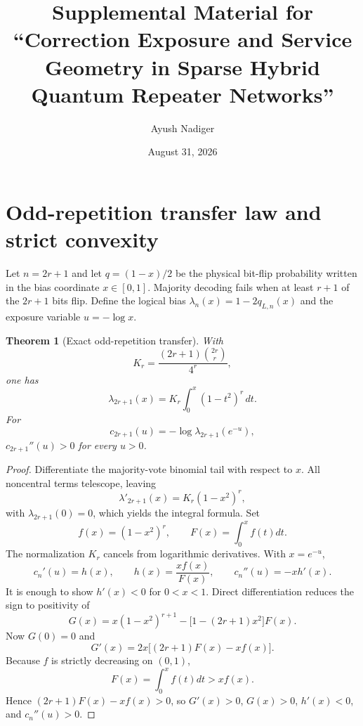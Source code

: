 \documentclass[aps,prx,preprint,superscriptaddress,nofootinbib,longbibliography]{revtex4-2}
\newtheorem{theorem}{Theorem}\newtheorem{proposition}[theorem]{Proposition}\newtheorem{lemma}[theorem]{Lemma}\newtheorem{corollary}[theorem]{Corollary}\newtheorem{definition}[theorem]{Definition}
\begin{document}
\title{Supplemental Material for ``Correction Exposure and Service Geometry in Sparse Hybrid Quantum Repeater Networks''}
\author{Ayush Nadiger}
\date{August 31, 2026}\maketitle

\section{Odd-repetition transfer law and strict convexity}
Let $n=2r+1$ and let $q=(1-x)/2$ be the physical bit-flip probability written in the bias coordinate $x\in[0,1]$. Majority decoding fails when at least $r+1$ of the $2r+1$ bits flip. Define the logical bias $\lambda_n(x)=1-2q_{L,n}(x)$ and the exposure variable $u=-\log x$.

\begin{theorem}[Exact odd-repetition transfer]
With
\begin{equation}
K_r=\frac{(2r+1)\binom{2r}{r}}{4^r},
\end{equation}
one has
\begin{equation}
\lambda_{2r+1}(x)=K_r\int_0^x(1-t^2)^r\,dt.
\end{equation}
For
\begin{equation}
c_{2r+1}(u)=-\log\lambda_{2r+1}(e^{-u}),
\end{equation}
$c_{2r+1}''(u)>0$ for every $u>0$.
\end{theorem}
\begin{proof}
Differentiate the majority-vote binomial tail with respect to $x$. All noncentral terms telescope, leaving
\begin{equation}
\lambda'_{2r+1}(x)=K_r(1-x^2)^r,
\end{equation}
with $\lambda_{2r+1}(0)=0$, which yields the integral formula. Set
\begin{equation}
f(x)=(1-x^2)^r,\qquad F(x)=\int_0^x f(t)dt.
\end{equation}
The normalization $K_r$ cancels from logarithmic derivatives. With $x=e^{-u}$,
\begin{equation}
c_n'(u)=h(x),\qquad h(x)=\frac{x f(x)}{F(x)},\qquad c_n''(u)=-x h'(x).
\end{equation}
It is enough to show $h'(x)<0$ for $0<x<1$. Direct differentiation reduces the sign to positivity of
\begin{equation}
G(x)=x(1-x^2)^{r+1}-\bigl[1-(2r+1)x^2\bigr]F(x).
\end{equation}
Now $G(0)=0$ and
\begin{equation}
G'(x)=2x\bigl[(2r+1)F(x)-x f(x)\bigr].
\end{equation}
Because $f$ is strictly decreasing on $(0,1)$,
\begin{equation}
F(x)=\int_0^x f(t)dt>x f(x).
\end{equation}
Hence $(2r+1)F(x)-xf(x)>0$, so $G'(x)>0$, $G(x)>0$, $h'(x)<0$, and $c_n''(u)>0$.
\end{proof}
\end{document}
